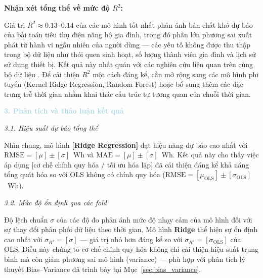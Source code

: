 \textbf{Nhận xét tổng thể về mức độ $R^2$:}

Giá trị $R^2 \approx 0.13$--$0.14$ của các mô hình tốt nhất phản ánh 
bản chất khó dự báo của bài toán tiêu thụ điện năng hộ gia đình, trong 
đó phần lớn phương sai xuất phát từ hành vi ngẫu nhiên của người dùng 
--- các yếu tố không được thu thập trong bộ dữ liệu như thói quen sinh 
hoạt, số lượng thành viên gia đình và lịch sử sử dụng thiết bị. Kết 
quả này nhất quán với các nghiên cứu liên quan trên cùng bộ dữ liệu 
\cite{candanedo2017data}. Để cải thiện $R^2$ một cách đáng kể, cần 
mở rộng sang các mô hình phi tuyến (Kernel Ridge Regression, Random 
Forest) hoặc bổ sung thêm các đặc trưng trễ thời gian
nhằm khai thác cấu trúc tự tương quan của chuỗi thời gian.

\noindent\textcolor{lightblue}{\textbf{3. Phân tích và thảo luận kết quả}}


\noindent\textcolor{infocolor}{\textit{3.1. Hiệu suất dự báo tổng thể}}

Nhìn chung, mô hình \textbf{[Ridge Regression]} đạt hiệu năng 
dự báo cao nhất với $\mathrm{RMSE} = [\mu] \pm [\sigma]$~Wh và 
$\mathrm{MAE} = [\mu] \pm [\sigma]$~Wh. Kết quả này cho thấy việc áp 
dụng [cơ chế chính quy hóa / tối ưu hóa lặp] đã cải thiện đáng kể khả 
năng tổng quát hóa so với OLS không có chính quy hóa 
($\mathrm{RMSE} = [\mu_{\mathrm{OLS}}] \pm [\sigma_{\mathrm{OLS}}]$~Wh).

\noindent\textcolor{infocolor}{\textit{3.2. Mức độ ổn định qua các fold}}

Độ lệch chuẩn $\sigma$ của các độ đo phản ánh mức độ nhạy cảm của mô 
hình đối với sự thay đổi phân phối dữ liệu theo thời gian. Mô hình 
\textbf{Ridge} thể hiện sự ổn định cao nhất với 
$\sigma_{R^2} = [\sigma]$ --- giá trị nhỏ hơn đáng kể so với 
$\sigma_{R^2} = [\sigma_{\mathrm{OLS}}]$ của OLS. Điều này chứng tỏ 
cơ chế chính quy hóa không chỉ cải thiện hiệu suất trung bình mà còn 
giảm phương sai mô hình (variance) --- phù hợp với phân tích lý thuyết 
Bias--Variance đã trình bày tại Mục~\ref{sec:bias_variance}.

